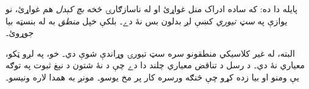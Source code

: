 \documentclass[../../../include/open-logic-section]{subfiles}
\begin{document}
پايله دا ده: که ساده ادراک منل غواړئ او له ناسازګارۍ څخه
\emph{بچ کېدل} هم غواړئ، نو يوازې په \emph{سټ تيوري} کښې
لږ بدلون بس نۀ دے۔ بلکې خپل \emph{منطق} به له بنسټه بيا جوړوئ۔

البته، له غير کلاسيکي منطقونو سره سټ تيورۍ وړاندې شوې دي۔
خو، په لږو ټکو، معياري نۀ دي۔ د رسل د تناقض معياري چلند دا
دے چې د نۀ شتون د نېغ ثبوت په توګه يې ومنو او بيا زده کړو
چې څنګه ورسره کار پر مخ يوسو۔ مونږ به همدا لاره ونيسو۔
\end{document}

